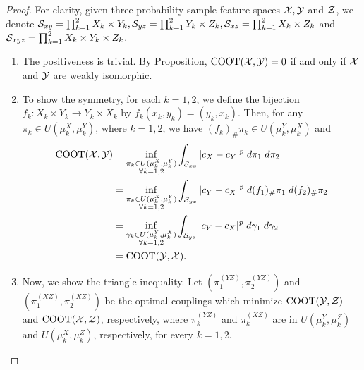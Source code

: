 \begin{proof}
    For clarity, given three probability sample-feature spaces $\mathcal X, \mathcal Y$ and $\mathcal Z$,
    we denote $\mathcal S_{xy} = \prod_{k=1}^2 X_k \times Y_k, \mathcal S_{yz} = \prod_{k=1}^2 Y_k \times Z_k,
    \mathcal S_{xz} = \prod_{k=1}^2 X_k \times Z_k$ and $\mathcal S_{xyz} = \prod_{k=1}^2 X_k \times Y_k \times Z_k$.
    \begin{enumerate}
      \item The positiveness is trivial. By Proposition, $\text{COOT}(\mathcal X, \mathcal Y) = 0$ if and only if
      $\mathcal X$ and $\mathcal Y$ are weakly isomorphic.

      \item To show the symmetry, for each $k = 1, 2$, we define the bijection
      $f_k: X_k \times Y_k \to Y_k \times X_k$ by $f_k(x_k,y_k) = (y_k,x_k)$.
      Then, for any $\pi_k \in U(\mu_k^X, \mu_k^Y)$, where $k=1,2$, we have $(f_k)_{\#} \pi_k \in U(\mu_k^Y, \mu_k^X)$ and
      \begin{equation}
        \begin{split}
          \text{COOT}(\mathcal X, \mathcal Y) &= \inf_{\substack{\pi_k \in U(\mu^X_k, \mu^Y_k) \\
          \forall k = 1,2}} \int_{\mathcal S_{xy}} \vert c_X - c_Y \vert^p \; d \pi_1 \; d \pi_2 \\
          &= \inf_{\substack{\pi_k \in U(\mu^X_k, \mu^Y_k) \\
          \forall k = 1,2}} \int_{\mathcal S_{yx}} \vert c_Y - c_X \vert^p \; d (f_1)_{\#} \pi_1 \; d (f_2)_{\#} \pi_2 \\
          &= \inf_{\substack{\gamma_k \in U(\mu^Y_k, \mu^X_k) \\
          \forall k = 1,2}} \int_{\mathcal S_{yx}} \vert c_Y - c_X \vert^p \; d \gamma_1 \; d \gamma_2 \\
          &= \text{COOT}(\mathcal Y, \mathcal X).
        \end{split}
      \end{equation}

      \item Now, we show the triangle inequality. Let $(\pi^{(YZ)}_1, \pi^{(YZ)}_2)$ and
      $(\pi^{(XZ)}_1, \pi^{(XZ)}_2)$ be the optimal couplings which minimize
      $\text{COOT}(\mathcal Y, \mathcal Z)$ and $\text{COOT}(\mathcal X, \mathcal Z)$, respectively, where
      $\pi^{(YZ)}_k$ and $\pi^{(XZ)}_k$ are in $U(\mu_k^Y, \mu_k^Z)$ and $U(\mu_k^X, \mu_k^Z)$,
      respectively, for every $k=1,2$.


\end{enumerate}
\end{proof}

